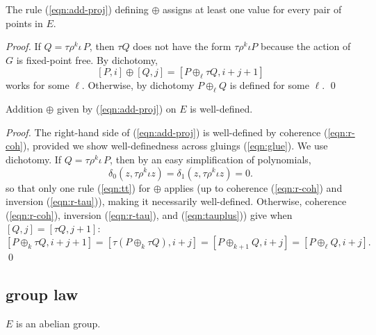 \documentclass{llncs}
\begin{document}
\begin{lemma}[covering]\label{lemma:cov} 
  The rule (\ref{eqn:add-proj}) defining
  $\oplus$ assigns at least one value for every pair of points in $E$.
\end{lemma}

\begin{proof} If $Q=\tau \rho^k \iota\,P$, then $\tau Q$ does not have
  the form $\tau\rho^k\iota P$ because the action of $G$ is
  fixed-point free.  By dichotomy,
\begin{equation}\label{eqn:tt}
[P,i]\oplus [Q,j] = [P\oplus_\ell \tau Q,i+j+1]
\end{equation}
works for some $\ell$.  Otherwise, by dichotomy $P\oplus_\ell Q$ is
defined for some $\ell$.
\qed\end{proof}

\begin{lemma} Addition $\oplus$ given by
  (\ref{eqn:add-proj}) on $E$ is well-defined.
\end{lemma}

\begin{proof}
  The right-hand side of (\ref{eqn:add-proj}) is well-defined by
  coherence (\ref{eqn:r-coh}), provided we show well-definedness
  across gluings (\ref{eqn:glue}).  We use dichotomy.  If $Q=\tau
  \rho^k \iota\,P$, then by an easy simplification of polynomials,
\[
\delta_0(z,\tau\rho^k\iota z)=\delta_1(z,\tau\rho^k\iota z)=0.
\]
so that only one rule (\ref{eqn:tt}) for $\oplus$ applies (up to
coherence (\ref{eqn:r-coh}) and inversion (\ref{eqn:r-tau})), making
it necessarily well-defined.  Otherwise, coherence (\ref{eqn:r-coh}),
inversion (\ref{eqn:r-tau}), and (\ref{eqn:tauplus})) give when
$[Q,j]=[\tau Q,j+1]$:
 \[ 
[P\oplus_k \tau Q,i+j+1]=[\tau(P\oplus_k \tau Q),i+j] =
 [P\oplus_{k+1} Q,i+j] = [P\oplus_\ell Q,i+j].
\]
\qed\end{proof}

\subsection{group law}

\begin{theorem}\label{thm:proj-group}  $E$ is an abelian group.
\end{theorem}
\end{document}

